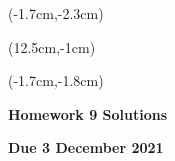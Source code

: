 \documentclass[12pt, oneside]{article}
\begin{document}
\begin{textblock*}{4cm}(-1.7cm,-2.3cm)
\end{textblock*}

\begin{textblock*}{8cm}(12.5cm,-1cm)
\end{textblock*}
\begin{textblock*}{13.5cm}(-1.7cm,-1.8cm)
\end{textblock*}

\vspace{1cm}

\begin{center}
\textbf{\Large Homework 9 Solutions}

\textbf{Due 3 December 2021}
\end{center}
\end{document}
